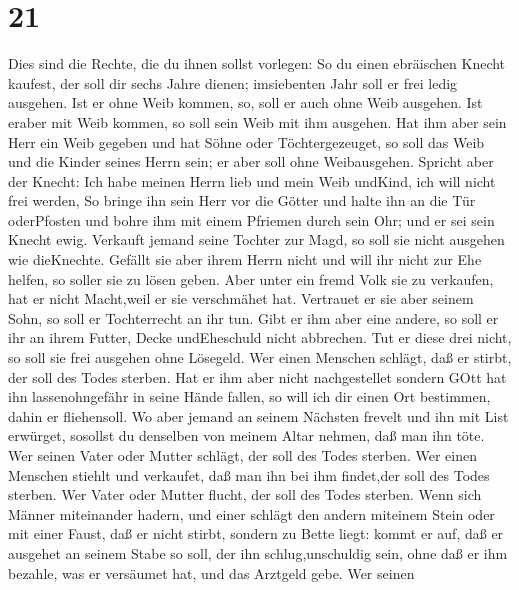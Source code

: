 \hypertarget{section-20}{%
\section{21}\label{section-20}}

 Dies sind die Rechte, die du ihnen sollst vorlegen:
 So du einen ebräischen Knecht kaufest, der soll dir sechs
Jahre dienen; imsiebenten Jahr soll er frei ledig ausgehen. 
Ist er ohne Weib kommen, so, soll er auch ohne Weib ausgehen. Ist eraber
mit Weib kommen, so soll sein Weib mit ihm ausgehen.  Hat
ihm aber sein Herr ein Weib gegeben und hat Söhne oder Töchtergezeuget,
so soll das Weib und die Kinder seines Herrn sein; er aber soll ohne
Weibausgehen.  Spricht aber der Knecht: Ich habe meinen
Herrn lieb und mein Weib undKind, ich will nicht frei werden,
 So bringe ihn sein Herr vor die Götter und halte ihn an die
Tür oderPfosten und bohre ihm mit einem Pfriemen durch sein Ohr; und er
sei sein Knecht ewig.  Verkauft jemand seine Tochter zur
Magd, so soll sie nicht ausgehen wie dieKnechte.  Gefällt
sie aber ihrem Herrn nicht und will ihr nicht zur Ehe helfen, so soller
sie zu lösen geben. Aber unter ein fremd Volk sie zu verkaufen, hat er
nicht Macht,weil er sie verschmähet hat.  Vertrauet er sie
aber seinem Sohn, so soll er Tochterrecht an ihr tun.  Gibt
er ihm aber eine andere, so soll er ihr an ihrem Futter, Decke
undEheschuld nicht abbrechen.  Tut er diese drei nicht, so
soll sie frei ausgehen ohne Lösegeld.  Wer einen Menschen
schlägt, daß er stirbt, der soll des Todes sterben.  Hat er
ihm aber nicht nachgestellet sondern GOtt hat ihn lassenohngefähr in
seine Hände fallen, so will ich dir einen Ort bestimmen, dahin er
fliehensoll.  Wo aber jemand an seinem Nächsten frevelt und
ihn mit List erwürget, sosollst du denselben von meinem Altar nehmen,
daß man ihn töte.  Wer seinen Vater oder Mutter schlägt,
der soll des Todes sterben.  Wer einen Menschen stiehlt und
verkaufet, daß man ihn bei ihm findet,der soll des Todes sterben.
 Wer Vater oder Mutter flucht, der soll des Todes sterben.
 Wenn sich Männer miteinander hadern, und einer schlägt den
andern miteinem Stein oder mit einer Faust, daß er nicht stirbt, sondern
zu Bette liegt:  kommt er auf, daß er ausgehet an seinem
Stabe so soll, der ihn schlug,unschuldig sein, ohne daß er ihm bezahle,
was er versäumet hat, und das Arztgeld gebe.  Wer seinen
